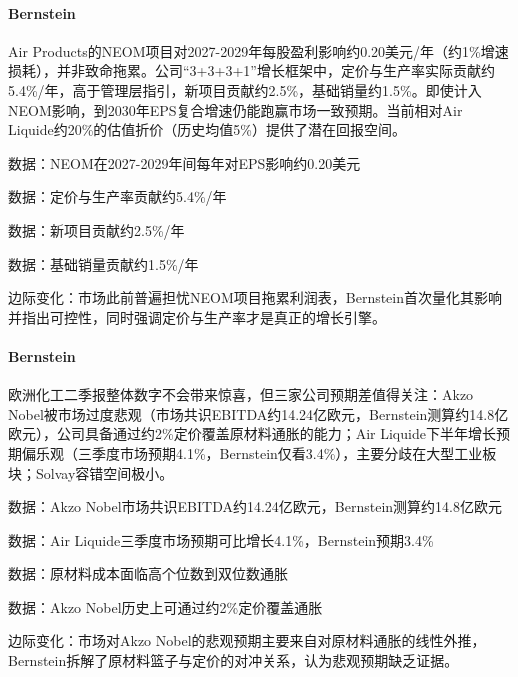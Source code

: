 \documentclass[11pt]{ctexart}
\begin{document}
\paragraph{Bernstein} Air Products的NEOM项目对2027-2029年每股盈利影响约0.20美元/年（约1\%增速损耗），并非致命拖累。公司“3+3+3+1”增长框架中，定价与生产率实际贡献约5.4\%/年，高于管理层指引，新项目贡献约2.5\%，基础销量约1.5\%。即使计入NEOM影响，到2030年EPS复合增速仍能跑赢市场一致预期。当前相对Air Liquide约20\%的估值折价（历史均值5\%）提供了潜在回报空间。
{\small\color{refgray}数据：NEOM在2027-2029年间每年对EPS影响约0.20美元\par}
{\small\color{refgray}数据：定价与生产率贡献约5.4\%/年\par}
{\small\color{refgray}数据：新项目贡献约2.5\%/年\par}
{\small\color{refgray}数据：基础销量贡献约1.5\%/年\par}
{\small\color{refgray}边际变化：市场此前普遍担忧NEOM项目拖累利润表，Bernstein首次量化其影响并指出可控性，同时强调定价与生产率才是真正的增长引擎。\par}
\paragraph{Bernstein} 欧洲化工二季报整体数字不会带来惊喜，但三家公司预期差值得关注：Akzo Nobel被市场过度悲观（市场共识EBITDA约14.24亿欧元，Bernstein测算约14.8亿欧元），公司具备通过约2\%定价覆盖原材料通胀的能力；Air Liquide下半年增长预期偏乐观（三季度市场预期4.1\%，Bernstein仅看3.4\%），主要分歧在大型工业板块；Solvay容错空间极小。
{\small\color{refgray}数据：Akzo Nobel市场共识EBITDA约14.24亿欧元，Bernstein测算约14.8亿欧元\par}
{\small\color{refgray}数据：Air Liquide三季度市场预期可比增长4.1\%，Bernstein预期3.4\%\par}
{\small\color{refgray}数据：原材料成本面临高个位数到双位数通胀\par}
{\small\color{refgray}数据：Akzo Nobel历史上可通过约2\%定价覆盖通胀\par}
{\small\color{refgray}边际变化：市场对Akzo Nobel的悲观预期主要来自对原材料通胀的线性外推，Bernstein拆解了原材料篮子与定价的对冲关系，认为悲观预期缺乏证据。\par}
\end{document}
